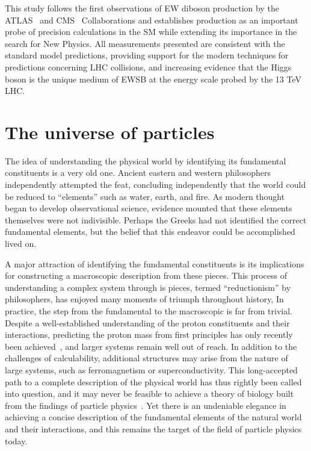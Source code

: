 This study follows the first observations of EW diboson production
by the ATLAS~\cite{ATLAS-CONF-2018-030,ATLAS-CONF-2018-033} and CMS~\cite{Sirunyan:2017ret} Collaborations
and establishes \EWWZ production as an important
probe of precision calculations in the SM while extending its importance 
in the search for New Physics.
All measurements presented are consistent with the standard model predictions,
providing support for the modern techniques for predictions concerning LHC collisions, and 
increasing evidence that the Higgs boson is the unique medium of EWSB 
at the energy scale probed by the 13 TeV LHC.

\section{The universe of particles}

The idea of understanding the physical world by identifying its
fundamental constituents is a very old one. Ancient eastern and
western philosophers independently attempted the feat, concluding
independently that the world could be reduced 
to ``elements'' such as water, earth, and fire.
As modern thought began to develop observational science, 
evidence mounted that these elements themselves were 
not indivisible. Perhaps the Greeks had not identified
the correct fundamental elements, but the belief that this endeavor could
be accomplished lived on.

A major attraction of identifying the fundamental constituents 
is its implications for constructing a macroscopic description from these
pieces. This process of understanding a complex system through is pieces, 
termed ``reductionism'' by philosophers, has enjoyed
many moments of triumph throughout history, 
In practice, the step from the fundamental to the macroscopic 
is far from trivial. Despite a well-established
understanding of the proton constituents and their interactions,
predicting the proton mass from first principles has only recently 
been achieved~\cite{Durr:2008zz}, and larger systems remain well
out of reach.
In addition to the challenges of calculability, additional structures
may arise from the nature of large systems, such as ferromagnetism or 
superconductivity.
This long-accepted path to a complete description of the physical world
has thus rightly been called into question, and it may never be feasible
to achieve a theory of biology built from the findings of particle 
physics~\cite{Anderson393}.
Yet there is an undeniable elegance in achieving a concise description
of the fundamental elements of the natural world and their interactions,
and this remains the target of the field of particle physics today. 

